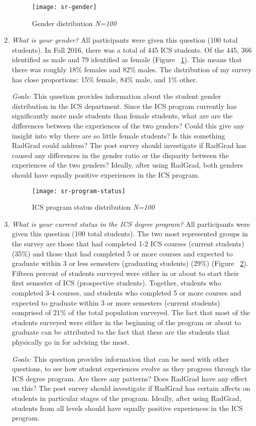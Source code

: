 \begin{enumerate}
\begin{figure}[h]
\centering
\texttt{[image: sr-gender]}
\caption{Gender distribution \textit{N=100}}
\label{gender}
\end{figure}
\item \textit{What is your gender?}
All participants were given this question (100 total students). In Fall 2016, there was a total of 445 ICS students. Of the 445, 366 identified as male and 79 identified as female (Figure ~\ref{gender}). This means that there was roughly 18\% females and 82\% males. The distribution of my survey has close proportions: 15\% female, 84\% male, and 1\% other. 

\textit{Goals:} This question provides information about the student gender distribution in the ICS department. Since the ICS program currently has significantly more male students than female students, what are are the differences between the experiences of the two genders? Could this give any insight into why there are so little female students? Is this something RadGrad could address? The post survey should investigate if RadGrad has caused any differences in the gender ratio or the disparity between the experiences of the two genders? Ideally, after using RadGrad, both genders should have equally positive experiences in the ICS program.
\begin{figure}[h]
\centering
\texttt{[image: sr-program-status]}
\caption{ICS program status distribution \textit{N=100}}
\label{status}
\end{figure}
\item \textit{What is your current status in the ICS degree program?}
All participants were given this question (100 total students). The two most represented groups in the survey are those that had completed 1-2 ICS courses (current students) (35\%) and those that had completed 5 or more courses and expected to graduate within 3 or less semesters (graduating students) (29\%) (Figure ~\ref{status}). Fifteen percent of students surveyed were either in or about to start their first semester of ICS (prospective students). Together, students who completed 3-4 courses, and students who completed 5 or more courses and expected to graduate within 3 or more semesters (current students) comprised of 21\% of the total population surveyed. The fact that most of the students surveyed were either in the beginning of the program or about to graduate can be attributed to the fact that these are the students that physically go in for advising the most. 

\textit{Goals:} This question provides information that can be used with other questions, to see how student experiences evolve as they progress through the ICS degree program. Are there any patterns? Does RadGrad have any effect on this? The post survey should investigate if RadGrad has certain affects on students in particular stages of the program. Ideally, after using RadGrad, students from all levels should have equally positive experiences in the ICS program. 
\end{enumerate}

